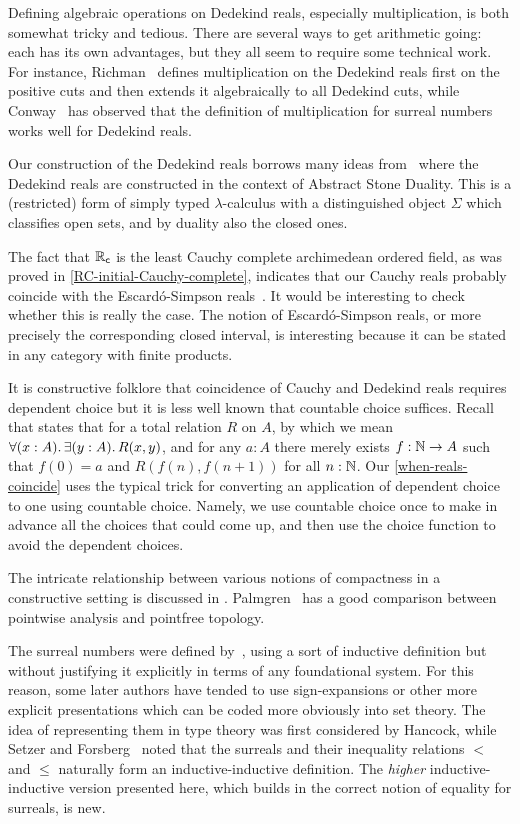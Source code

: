 Defining algebraic operations on Dedekind reals, especially multiplication, is both somewhat tricky and tedious.
There are several ways to get arithmetic going: each has its own advantages, but they all seem to require some technical work.
For instance, Richman~\cite{Richman:reals} defines multiplication on the Dedekind reals first on the positive cuts and then extends it algebraically to all Dedekind cuts, while Conway~\cite{conway:onag} has observed that the definition of multiplication for surreal numbers works well for Dedekind reals.

Our construction of the Dedekind reals borrows many ideas from~\cite{BauerTaylor09} where the Dedekind reals are constructed in the context of Abstract Stone Duality. This is a (restricted) form of simply typed $\lambda$-calculus with a distinguished object $\Sigma$ which classifies open sets, and by duality also the closed ones.

The fact that $\mathbb{R}_\mathsf{c}$ is the least Cauchy complete archimedean ordered field, as was proved in \autoref{RC-initial-Cauchy-complete}, indicates that our Cauchy reals probably coincide with the Escard{\'o}-Simpson reals~\cite{EscardoSimpson:01}. It would be interesting to check whether this is really the case. The notion of Escard{\'o}-Simpson reals, or more precisely the corresponding closed interval, is interesting because it can be stated in any category with finite products.

It is constructive folklore that coincidence of Cauchy and Dedekind reals requires dependent choice but it is less well known that countable choice suffices. Recall that  states that for a total relation $R$ on $A$, by which we mean $\fall{x : A} \exis{y : A} R(x,y)$, and for any $a : A$ there merely exists $f : \mathbb{N} \to A$ such that $f(0) = a$ and $R(f(n), f(n+1))$ for all $n : \mathbb{N}$. Our \autoref{when-reals-coincide} uses the typical trick for converting an application of dependent choice to one using countable choice. Namely, we use countable choice once to make in advance all the choices that could come up, and then use the choice function to avoid the dependent choices.

The intricate relationship between various notions of compactness in a constructive
setting is discussed in \cite{bridges2002compactness}. Palmgren~\cite{Palmgren:FT} has a 
good comparison between pointwise analysis and 
pointfree topology.

The surreal numbers were defined by~\cite{conway:onag}, using a sort of inductive definition but without justifying it explicitly in terms of any foundational system.
For this reason, some later authors have tended to use sign-expansions or other more explicit presentations which can be coded more obviously into set theory.
The idea of representing them in type theory was first considered by Hancock, while
Setzer and Forsberg~\cite{forsbergfinite} noted that the surreals and their inequality relations $<$ and $\le$ naturally form an inductive-inductive definition.
The \emph{higher} inductive-inductive version presented here, which builds in the correct notion of equality for surreals, is new.


